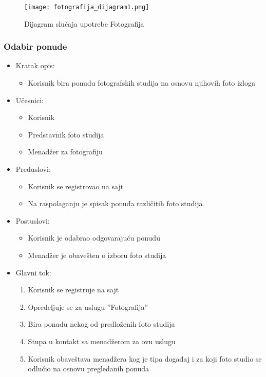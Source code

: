 \documentclass[a4paper]{article}
\begin{document}
\begin{figure}[htp]
    \centering
    \texttt{[image: fotografija\_dijagram1.png]}
    \caption{Dijagram slučaja upotrebe Fotografija}
    \label{fig:PrenosiviBar}
\end{figure}

\subsubsection{Odabir ponude}
\begin{itemize}
    \item Kratak opis: 
    \begin{itemize}
        \item Korisnik bira ponudu fotografskih studija na osnovu njihovih foto izloga
    \end{itemize}
    \item Učesnici:
        \begin{itemize}
        \item Korisnik
        \item Predstavnik foto studija
        \item Menadžer za fotografiju
    \end{itemize}
    \item Preduslovi:
        \begin{itemize}
            \item Korisnik se registrovao na sajt
            \item Na raspolaganju je spisak ponuda različitih foto studija
        \end{itemize}
    \item Postuslovi:
        \begin{itemize}
            \item Korisnik je odabrao odgovarajuću ponudu
            \item Menadžer je obavešten o izboru foto studija
        \end{itemize}
    \item Glavni tok:
        \begin{enumerate}
            \item Korisnik se registruje na sajt
            \item Opredeljuje se za uslugu ''Fotografija''
            \item Bira ponudu nekog od predloženih foto studija
            \item Stupa u kontakt sa menadžerom za ovu uslugu
            \item Korisnik obaveštava menadžera kog je tipa događaj i za koji foto studio se odlučio na osnovu pregledanih ponuda 

\end{enumerate}
\end{itemize}
\end{document}

